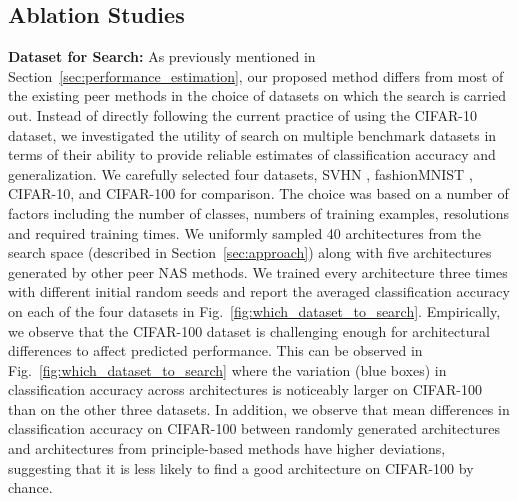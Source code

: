 \documentclass[journal]{IEEEtran}
\theoremstyle{definition}
\theoremstyle{remark}
\begin{document}
\subsection{Ablation Studies\label{sec:hyper-param-analysis}}
\vspace{3pt}
\noindent\textbf{Dataset for Search:} As previously mentioned in Section~\ref{sec:performance_estimation}, our proposed method differs from most of the existing peer methods in the choice of datasets on which the search is carried out. Instead of directly following the current practice of using the CIFAR-10 dataset, we investigated the utility of search on multiple benchmark datasets in terms of their ability to provide reliable estimates of classification accuracy and generalization. We carefully selected four datasets, SVHN \cite{netzer2011reading}, fashionMNIST \cite{xiao2017fashion}, CIFAR-10, and CIFAR-100 for comparison. The choice was based on a number of factors including the number of classes, numbers of training examples, resolutions and required training times. We uniformly sampled 40 architectures from the search space (described in Section~\ref{sec:approach}) along with five architectures generated by other peer NAS methods. We trained every architecture three times with different initial random seeds and report the averaged classification accuracy on each of the four datasets in Fig.~\ref{fig:which_dataset_to_search}. Empirically, we observe that the CIFAR-100 dataset is challenging enough for architectural differences to affect predicted performance. This can be observed in Fig.~\ref{fig:which_dataset_to_search} where the variation (blue boxes) in classification accuracy across architectures is noticeably larger on CIFAR-100 than on the other three datasets. In addition, we observe that mean differences in classification accuracy on CIFAR-100 between randomly generated architectures and architectures from principle-based methods have higher deviations, suggesting that it is less likely to find a good architecture on CIFAR-100 by chance.
\end{document}
